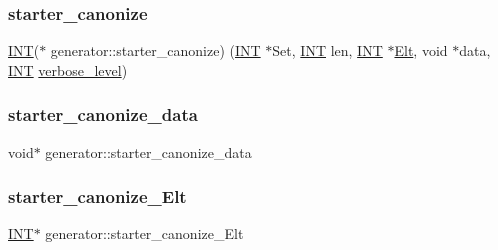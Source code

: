 \mbox{\label{classgenerator_a2c271cde2239094c342418e100097f75}} 
\subsubsection{\texorpdfstring{starter\+\_\+canonize}{starter\_canonize}}
{\footnotesize\ttfamily \mbox{\hyperlink{galois_8h_a09fddde158a3a20bd2dcadb609de11dc}{I\+NT}}($\ast$ generator\+::starter\+\_\+canonize) (\mbox{\hyperlink{galois_8h_a09fddde158a3a20bd2dcadb609de11dc}{I\+NT}} $\ast$Set, \mbox{\hyperlink{galois_8h_a09fddde158a3a20bd2dcadb609de11dc}{I\+NT}} len, \mbox{\hyperlink{galois_8h_a09fddde158a3a20bd2dcadb609de11dc}{I\+NT}} $\ast$\mbox{\hyperlink{simeon_8_c_aec1406935bdb1fee3561fcb840964100}{Elt}}, void $\ast$data, \mbox{\hyperlink{galois_8h_a09fddde158a3a20bd2dcadb609de11dc}{I\+NT}} \mbox{\hyperlink{classgenerator_a7fedc6488314cbc00dbfcc42d311e1ce}{verbose\+\_\+level}})}

\mbox{\label{classgenerator_af3c7b160be9d1467f40a1eaa438eef5c}} 
\subsubsection{\texorpdfstring{starter\+\_\+canonize\+\_\+data}{starter\_canonize\_data}}
{\footnotesize\ttfamily void$\ast$ generator\+::starter\+\_\+canonize\+\_\+data}

\mbox{\label{classgenerator_ae54319a99c18540ebb81c934c93a6619}} 
\subsubsection{\texorpdfstring{starter\+\_\+canonize\+\_\+\+Elt}{starter\_canonize\_Elt}}
{\footnotesize\ttfamily \mbox{\hyperlink{galois_8h_a09fddde158a3a20bd2dcadb609de11dc}{I\+NT}}$\ast$ generator\+::starter\+\_\+canonize\+\_\+\+Elt}

